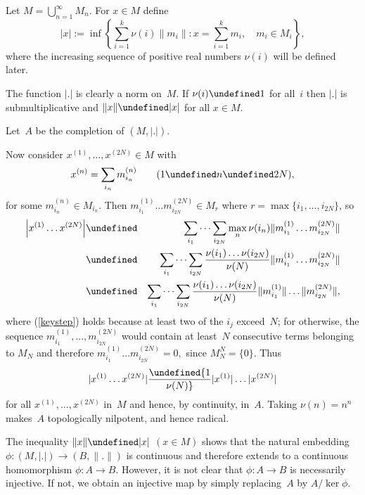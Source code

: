 \documentclass[11pt]{article}
\let\leq\undefined  \let\geq\undefined
\let\le\leq   \let\ge\geq
\newenvironment{Proof}{{\it Proof. }}{}%
\newcommand{\Detail}[1]{}
\begin{document}
\begin{Proof}
Let $M = \bigcup_{n=1}^\infty M_n$.  For $x \in M$ define
$$|x| := \inf\left\{\sum_{i=1}^k \nu(i)\|m_i\|: x = \sum_{i=1}^k m_i,\quad
                                                        m_i \in M_i\right\},$$
where the increasing sequence of positive real numbers $\nu(i)$ will be defined later.

The function $|.|$ is clearly a norm on~$M$.   If $\nu(i) \ge 1$ for all~$i$
then $|.|$ is submultiplicative and $\|x\| \le |x|$ for all $x \in M$.
\Detail{If
$$x = \sum_{i=1}^k m_i \qquad \mbox{and} \qquad y = \sum_{j=1}^\ell m_i'$$
then
$$xy = \sum_{i,j} m_im_j'.$$
Since the $M_n$ are subalgebras, $m_im_j' \in M_{\max\{i,j\}}$, so
$$|xy| \le \sum_{i,j} \nu(\max\{i,j\})\|m_i\|\,\|m_j'\|
       \le \sum_{i,j} \nu(i)\nu(j)\|m_i\|\,\|m_j'\|
		  = |x|\,|y|.$$
If $x \in M$ and $x = \sum_{i=1}^k m_i$ as above, then
$$\|x\| \le \sum_{i=1}^k \|m_i\| \le \sum_{i=1}^k \nu(i)\|m_i\|.$$
Therefore $\|x\| \le |x|$ for all $x \in M$.}
Let~$A$ be the completion of $(M,|.|)$.

Now consider $x^{(1)}, \dots,x^{(2N)} \in M$ with
$$x^{(n)} = \sum_{i_n} m_{i_n}^{(n)}\qquad(1 \le n \le 2N),$$
for some $m_{i_n}^{(n)}\in M_{i_n}$.  Then
$m_{i_1}^{(1)}\dots m_{i_{2N}}^{(2N)} \in M_r$ where
$r = \max\{i_1,\dots,i_{2N}\}$, so
\begin{eqnarray}
\left|x^{(1)}\dots x^{(2N)}\right|
& \le & \sum_{i_1}\dots\sum_{i_{2N}}\max_n\nu(i_n)\|m_{i_1}^{(1)}\dots m_{i_{2N}}^{(2N)}\|\nonumber\\
& \le & \sum_{i_1}\dots\sum_{i_{2N}}{\nu(i_1)\dots\nu(i_{2N})\over\nu(N)}
                                  \|m_{i_1}^{(1)}\dots m_{i_{2N}}^{(2N)}\|\label{keystep}\\
& \le & \sum_{i_1}\dots\sum_{i_{2N}}{\nu(i_1)\dots\nu(i_{2N})\over\nu(N)}
                                     \|m_{i_1}^{(1)}\|\dots\| m_{i_{2N}}^{(2N)}\|, \nonumber
\end{eqnarray}
where (\ref{keystep}) holds because at least two of the $i_j$ exceed~$N$; for
otherwise, the sequence $m_{i_1}^{(1)},\dots, m_{i_{2N}}^{(2N)}$ would contain
at least~$N$ consecutive terms belonging to $M_N$ and therefore
$m_{i_1}^{(1)}\dots m_{i_{2N}}^{(2N)}= 0,$ since $M_N^N=\{0\}$.  Thus
$$|x^{(1)}\dots x^{(2N)}| \le {1\over\nu(N)}|x^{(1)}|\dots |x^{(2N)}|$$
for all $x^{(1)}, \dots,x^{(2N)}$ in~$M$ and hence, by continuity, in~$A$.
Taking $\nu(n) = n^n$ makes~$A$ topologically nilpotent, and hence radical.

The inequality $\|x\| \le |x|$ $(x \in M)$ shows that the natural embedding
$\phi: (M,|.|) \to (B,\|.\|)$ is continuous and therefore extends to a
continuous homomorphism $\phi:A \to B$.   However, it is not clear that
$\phi:A \to B$ is necessarily injective.   If not, we obtain an injective map
by simply replacing~$A$ by $A/\ker\phi$.
\end{Proof}
\end{document}
